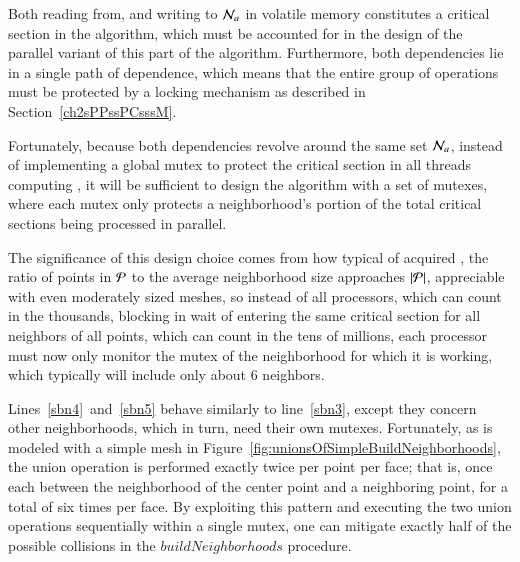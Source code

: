 Both reading from, and writing to $\mathcal{N}_a$ in volatile memory constitutes a critical section in the algorithm, which must be accounted for in the design of the parallel variant of this part of the algorithm. Furthermore, both dependencies lie in a single path of dependence, which means that the entire group of operations must be protected by a locking mechanism as described in Section~\ref{ch2sPPssPCsssM}.

Fortunately, because both dependencies revolve around the same set $\mathcal{N}_a$, instead of implementing a global \gls{mutex} to protect the critical section in all threads computing , it will be sufficient to design the algorithm with a set of mutexes, where each mutex only protects a neighborhood's portion of the total critical sections being processed in parallel.

The significance of this design choice comes from how typical of acquired \tdd{}, the ratio of points in $\mathcal{P}$ to the average neighborhood size approaches $|\mathcal{P}|$, appreciable with even moderately sized meshes, so instead of all processors, which can count in the thousands, blocking in wait of entering the same critical section for all neighbors of all points, which can count in the tens of millions, each processor must now only monitor the mutex of the neighborhood for which it is working, which typically will include only about 6 neighbors.

Lines~\ref{sbn4}~and~\ref{sbn5} behave similarly to line~\ref{sbn3}, except they concern other neighborhoods, which in turn, need their own mutexes. Fortunately, as is modeled with a simple mesh in Figure~\ref{fig:unionsOfSimpleBuildNeighborhoods}, the union operation is performed exactly twice per point per face; that is, once each between the neighborhood of the center point and a neighboring point, for a total of six times per face. By exploiting this pattern and executing the two union operations sequentially within a single mutex, one can mitigate exactly half of the possible collisions in the $\mathit{buildNeighborhoods}$ procedure.

%
%
